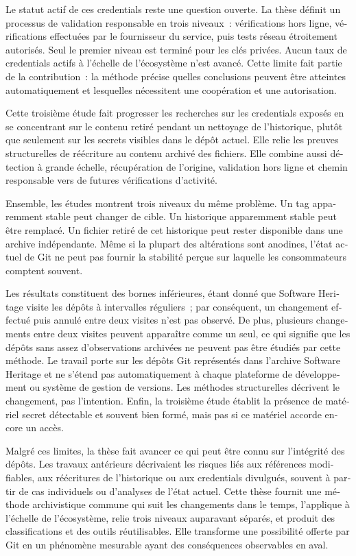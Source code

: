 \begin{otherlanguage}{french}
\begin{SingleSpace}
Le statut actif de ces credentials reste une question ouverte.
La thèse définit un processus de validation responsable en trois niveaux~: vérifications hors ligne, vérifications effectuées par le fournisseur du service, puis tests réseau étroitement autorisés.
Seul le premier niveau est terminé pour les clés privées.
Aucun taux de credentials actifs à l'échelle de l'écosystème n'est avancé.
Cette limite fait partie de la contribution~: la méthode précise quelles conclusions peuvent être atteintes automatiquement et lesquelles nécessitent une coopération et une autorisation.

Cette troisième étude fait progresser les recherches sur les credentials exposés en se concentrant sur le contenu retiré pendant un nettoyage de l'historique, plutôt que seulement sur les secrets visibles dans le dépôt actuel.
Elle relie les preuves structurelles de réécriture au contenu archivé des fichiers.
Elle combine aussi détection à grande échelle, récupération de l'origine, validation hors ligne et chemin responsable vers de futures vérifications d'activité.

Ensemble, les études montrent trois niveaux du même problème.
Un tag apparemment stable peut changer de cible.
Un historique apparemment stable peut être remplacé.
Un fichier retiré de cet historique peut rester disponible dans une archive indépendante.
Même si la plupart des altérations sont anodines, l'état actuel de Git ne peut pas fournir la stabilité perçue sur laquelle les consommateurs comptent souvent.

Les résultats constituent des bornes inférieures, étant donné que Software Heritage visite les dépôts à intervalles réguliers~; par conséquent, un changement effectué puis annulé entre deux visites n'est pas observé.
De plus, plusieurs changements entre deux visites peuvent apparaître comme un seul, ce qui signifie que les dépôts sans assez d'observations archivées ne peuvent pas être étudiés par cette méthode.
Le travail porte sur les dépôts Git représentés dans l'archive Software Heritage et ne s'étend pas automatiquement à chaque plateforme de développement ou système de gestion de versions.
Les méthodes structurelles décrivent le changement, pas l'intention.
Enfin, la troisième étude établit la présence de matériel secret détectable et souvent bien formé, mais pas si ce matériel accorde encore un accès.

Malgré ces limites, la thèse fait avancer ce qui peut être connu sur l'intégrité des dépôts.
Les travaux antérieurs décrivaient les risques liés aux références modifiables, aux réécritures de l'historique ou aux credentials divulgués, souvent à partir de cas individuels ou d'analyses de l'état actuel.
Cette thèse fournit une méthode archivistique commune qui suit les changements dans le temps, l'applique à l'échelle de l'écosystème, relie trois niveaux auparavant séparés, et produit des classifications et des outils réutilisables.
Elle transforme une possibilité offerte par Git en un phénomène mesurable ayant des conséquences observables en aval.


\end{SingleSpace}
\end{otherlanguage}
